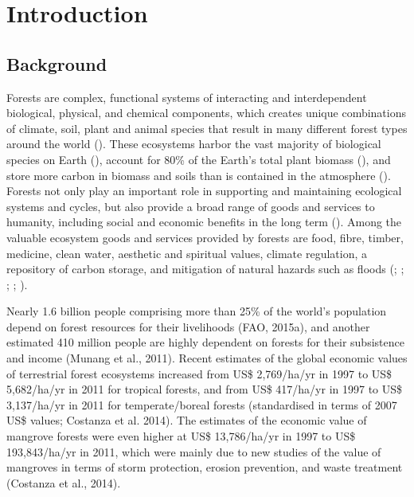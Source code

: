 
\chapter{Introduction}
\label{cha: introduction}

\section{Background}
\label{sec: intro-background}

Forests are complex, functional systems of interacting and interdependent biological, physical, and chemical components, which creates unique combinations of climate, soil, plant and animal species that result in many different forest types around the world (\cite{blanco_forest_2012}). These ecosystems harbor the vast majority of biological species on Earth (\cite{pan_structure_2013}), account for 80\% of the Earth’s total plant biomass (\cite{kindermann_global_2008}), and store more carbon in biomass and soils than is contained in the atmosphere (\cite{pan_large_2011}). Forests not only play an important role in supporting and maintaining ecological systems and cycles, but also provide a broad range of goods and services to humanity, including social and economic benefits in the long term (\cite{fao_global_2015}). Among the valuable ecosystem goods and services provided by forests are food, fibre, timber, medicine, clean water, aesthetic and spiritual values, climate regulation, a repository of carbon storage, and mitigation of natural hazards such as floods (\cite{pimentel_value_1997}; \cite{pearce_economic_2001}; \cite{blanco_forest_2012}; \cite{pan_structure_2013}; \cite{chazdon_when_2016}).

Nearly 1.6 billion people comprising more than 25\% of the world’s population depend on forest resources for their livelihoods (FAO, 2015a), and another estimated 410 million people are highly dependent on forests for their subsistence and income (Munang et al., 2011). Recent estimates of the global economic values of terrestrial forest ecosystems increased from US\$ 2,769/ha/yr in 1997 to US\$ 5,682/ha/yr in 2011 for tropical forests, and from US\$ 417/ha/yr in 1997 to US\$ 3,137/ha/yr in 2011 for temperate/boreal forests (standardised in terms of 2007 US\$ values; Costanza et al. 2014). The estimates of the economic value of mangrove forests were even higher at US\$ 13,786/ha/yr in 1997 to US\$ 193,843/ha/yr in 2011, which were mainly due to new studies of the value of mangroves in terms of storm protection, erosion prevention, and waste treatment (Costanza et al., 2014).

